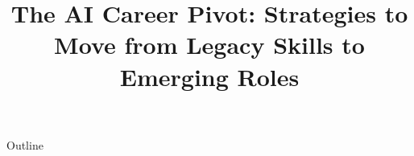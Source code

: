 \documentclass[xcolor=dvipsnames,compress,t,pdf,9pt]{beamer}
\title[\insertframenumber /\inserttotalframenumber]{The  AI Career Pivot: Strategies to Move from Legacy Skills to Emerging Roles}
\begin{document}
	\begin{frame}
	\titlepage
	\end{frame}
	
	\begin{frame}{Outline}
	    \tableofcontents
	\end{frame}

	
	
\end{document}
